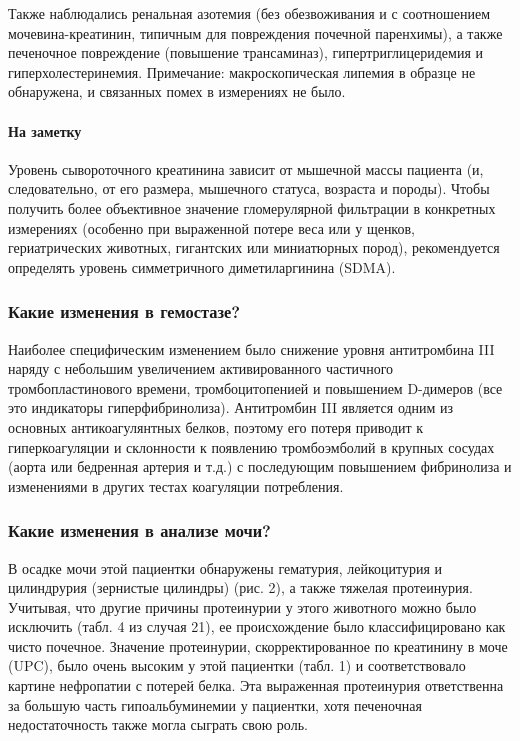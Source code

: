\documentclass[a4paper,12pt]{book}
\begin{document}
Также наблюдались ренальная азотемия (без обезвоживания и с соотношением мочевина-креатинин, типичным для повреждения почечной паренхимы), а также печеночное повреждение (повышение трансаминаз), гипертриглицеридемия и гиперхолестеринемия. Примечание: макроскопическая липемия в образце не обнаружена, и связанных помех в измерениях не было.

\paragraph{На заметку}
Уровень сывороточного креатинина зависит от мышечной массы пациента (и, следовательно, от его размера, мышечного статуса, возраста и породы). Чтобы получить более объективное значение гломерулярной фильтрации в конкретных измерениях (особенно при выраженной потере веса или у щенков, гериатрических животных, гигантских или миниатюрных пород), рекомендуется определять уровень симметричного диметиларгинина (SDMA).

\subsubsection*{Какие изменения в гемостазе?}
Наиболее специфическим изменением было снижение уровня антитромбина III наряду с небольшим увеличением активированного частичного тромбопластинового времени, тромбоцитопенией и повышением D-димеров (все это индикаторы гиперфибринолиза). Антитромбин III является одним из основных антикоагулянтных белков, поэтому его потеря приводит к гиперкоагуляции и склонности к появлению тромбоэмболий в крупных сосудах (аорта или бедренная артерия и т.д.) с последующим повышением фибринолиза и изменениями в других тестах коагуляции потребления.

\subsubsection*{Какие изменения в анализе мочи?}
В осадке мочи этой пациентки обнаружены гематурия, лейкоцитурия и цилиндрурия (зернистые цилиндры) (рис. 2), а также тяжелая протеинурия. Учитывая, что другие причины протеинурии у этого животного можно было исключить (табл. 4 из случая 21), ее происхождение было классифицировано как чисто почечное. Значение протеинурии, скорректированное по креатинину в моче (UPC), было очень высоким у этой пациентки (табл. 1) и соответствовало картине нефропатии с потерей белка. Эта выраженная протеинурия ответственна за большую часть гипоальбуминемии у пациентки, хотя печеночная недостаточность также могла сыграть свою роль.
\end{document}
